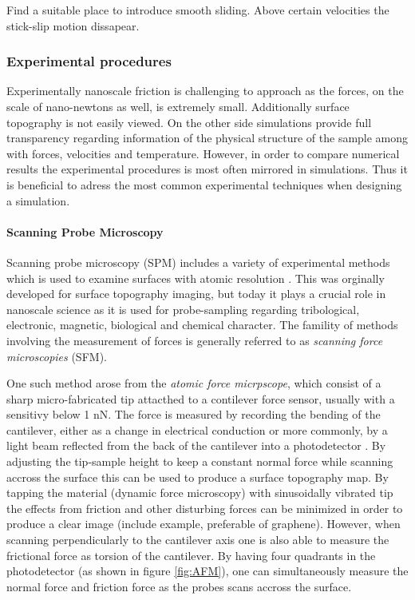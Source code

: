 Find a suitable place to introduce smooth sliding. Above certain velocities the stick-slip motion dissapear. \cite[p. 142-ish]{gnecco_meyer_2015}

\subsubsection{Experimental procedures}
\cite{gnecco_meyer_2015}


Experimentally nanoscale friction is challenging to approach as the forces, on the scale of nano-newtons as well, is extremely small. Additionally surface topography is not easily viewed. On the other side simulations provide full transparency regarding information of the physical structure of the sample among with forces, velocities and temperature. However, in order to compare numerical results the experimental procedures is most often mirrored in simulations. Thus it is beneficial to adress the most common experimental techniques when designing a simulation. 


\paragraph*{Scanning Probe Microscopy}

Scanning probe microscopy (SPM) includes a variety of experimental methods which
is used to examine surfaces with atomic resolution \cite[p.
6-]{BHUSHAN20051507}. This was orginally developed for surface topography
imaging, but today it plays a crucial role in nanoscale science as it is used
for probe-sampling regarding tribological, electronic, magnetic, biological and
chemical character. The famility of methods involving the measurement of forces
is generally referred to as \textit{scanning force microscopies} (SFM).

One such method arose from the \textit{atomic force micrpscope}, which consist
of a sharp micro-fabricated tip attacthed to a contilever force sensor, usually
with a sensitivy below 1 nN. The force is measured by recording the bending of
the cantilever, either as a change in electrical conduction or more commonly, by
a light beam reflected from the back of the cantilever into a photodetector
\cite{gnecco_meyer_2015}. By adjusting the tip-sample height to keep a constant
normal force while scanning accross the surface this can be used to produce a
surface topography map. By tapping the material (dynamic force microscopy) with sinusoidally vibrated tip the effects from friction and other disturbing forces can be minimized in order to produce a clear image (include example, preferable of graphene). However, when scanning perpendicularly to the cantilever
axis one is also able to measure the frictional force as torsion of the
cantilever. By having four quadrants in the photodetector (as shown in figure
\ref{fig:AFM}), one can simultaneously measure the normal force and friction
force as the probes scans accross the surface. 


